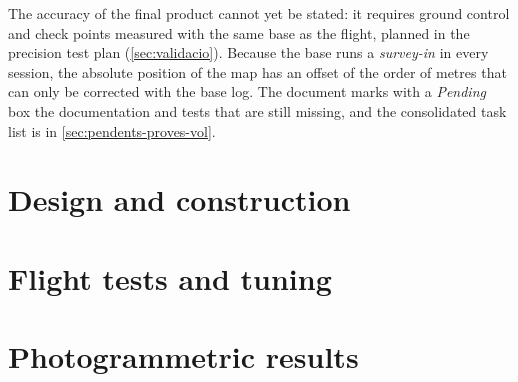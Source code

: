 \documentclass[11pt,a4paper,openany]{book}
\begin{document}
The accuracy of the final product cannot yet be stated: it requires ground control and check points measured with the same base as the flight, planned in the precision test plan (\cref{sec:validacio}). Because the base runs a \emph{survey-in} in every session, the absolute position of the map has an offset of the order of metres that can only be corrected with the base log. The document marks with a \emph{Pending} box the documentation and tests that are still missing, and the consolidated task list is in \cref{sec:pendents-proves-vol}.

\tableofcontents

\mainmatter

\part{Design and construction}



\part{Flight tests and tuning}


\part{Photogrammetric results}


\backmatter
\printbibliography[title={References}]
\end{document}
